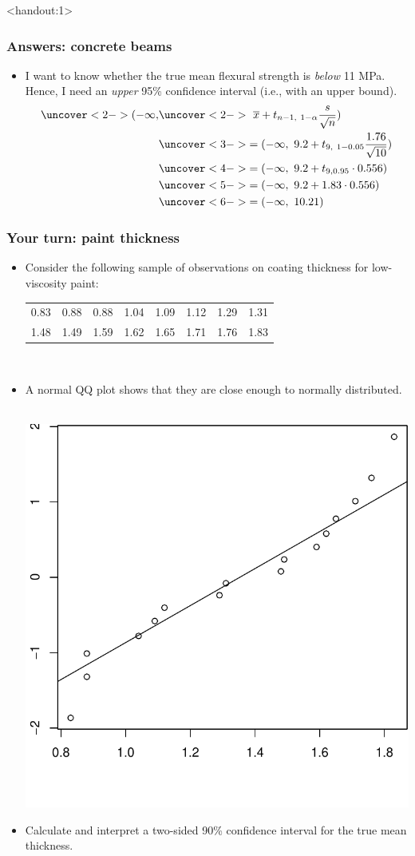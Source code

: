 \documentclass[handout]{beamer}\usepackage[]{graphicx}\usepackage[]{color}
\newenvironment{knitrout}{}{} %
\newcommand{\answers}{1}
\providecommand{\ov}[1]{\overline{#1}}
\providecommand{\q}{$\quad$ \newline}
\numberwithin{equation}{section}
\begin{document}
\begin{frame}<handout:\answers>
\frametitle{Answers: concrete beams}
\begin{itemize}
\item I want to know whether the true mean flexural strength is \emph{below} 11 MPa. Hence, I need an \emph{upper} 95\% confidence interval (i.e., with an upper bound). 
\begin{align*}
\uncover<2->{(-\infty,} &\uncover<2->{\ \ov{x} + t_{n - 1, \ 1- \alpha } \frac{s}{\sqrt{n}})} \\
&\uncover<3->{= (-\infty, \ 9.2 + t_{9, \ 1- 0.05 } \frac{1.76}{\sqrt{10}})} \\
&\uncover<4->{= (-\infty, \ 9.2 + t_{9, 0.95} \cdot 0.556)} \\
&\uncover<5->{= (-\infty, \ 9.2 + 1.83 \cdot 0.556)} \\
&\uncover<6->{= (-\infty, \ 10.21)}
\end{align*}
 
\end{itemize}
\end{frame}


\begin{frame}
\frametitle{Your turn: paint thickness} \scriptsize
\begin{itemize}
\item Consider the following sample of observations on coating thickness for low-viscosity paint: \q
\begin{tabular}{cccccccc}
0.83 & 0.88 & 0.88 & 1.04 & 1.09 & 1.12 & 1.29 & 1.31 \\
1.48 & 1.49 & 1.59 & 1.62 & 1.65 & 1.71 & 1.76 & 1.83
\end{tabular} \q
\item A normal QQ plot shows that they are close enough to normally distributed. \q 
\begin{center}
\begin{knitrout}
\color{fgcolor}
\includegraphics[width=.4\textwidth,height=.4\textheight]{figure/unnamed-chunk-2-1} 

\end{knitrout}
\end{center}
\item Calculate and interpret a two-sided 90\% confidence interval for the true mean thickness.
\end{itemize}
\end{frame}
\end{document}
